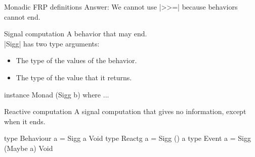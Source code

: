 \documentclass{beamer}
\begin{document}
\begin{frame}{Monadic FRP definitions}
Answer: We cannot use |>>=| because behaviors cannot \alert{end}.
\vspace{0.3cm}
\begin{block}{Signal computation}
A behavior that may end. \\
|Sigg| has two type arguments:
\begin{itemize}
\item The type of the values of the behavior.
\item The type of the value that it returns.
\end{itemize}
\vspace{-0.5cm}
\begin{code}
instance Monad (Sigg b) where ...
\end{code}
\vspace{-0.8cm}
\end{block}
\pause
\begin{block}{Reactive computation}
A signal computation that gives no information, except when it ends.
\end{block}
\vspace{-0.25cm}


\begin{code}
type Behaviour  a  = Sigg a Void
type Reactg     a  = Sigg () a
type Event      a  = Sigg (Maybe a) Void
\end{code}

\end{frame}
\end{document}
